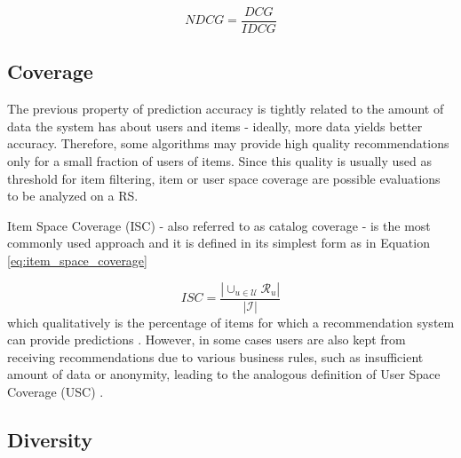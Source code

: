 \begin{equation}
	\label{eq:NDCG}
	NDCG = \frac{DCG}{IDCG}
\end{equation}

\subsection{Coverage}

The previous property of prediction accuracy is tightly related to the amount of data the system has about users and items - ideally, more data yields better accuracy. Therefore, some algorithms may provide high quality recommendations only for a small fraction of users of items. Since this quality is usually used as threshold for item filtering, item or user space coverage are possible evaluations to be analyzed on a RS. 

Item Space Coverage (ISC)  - also referred to as catalog coverage - is the most commonly used approach and it is defined in its simplest form as in Equation \ref{eq:item_space_coverage}

\begin{equation}
    \label{eq:item_space_coverage}
    ISC = \frac{|\cup_{u \in \mathcal{U}} \mathcal{R}_u|}{|\mathcal{I}|}
\end{equation} which qualitatively is the percentage of items for which a recommendation system can provide predictions \cite{1999AlgorithmicFramework}. However, in some cases users are also kept from receiving recommendations due to various business rules, such as insufficient amount of data or anonymity, leading to the analogous definition of User Space Coverage (USC)  \cite{2011EvaluatingRS}.





\subsection{Diversity}


